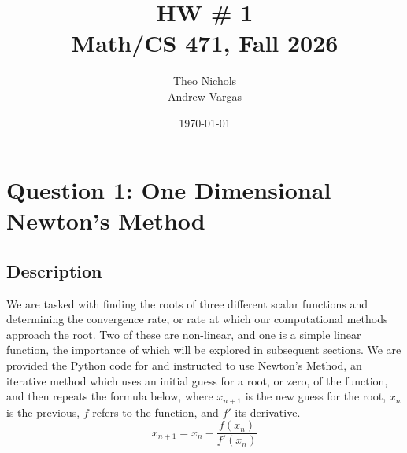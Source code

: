 \documentclass[12pt]{article}
\title{ HW \# 1\\ Math/CS 471, Fall 2026}
\author{Theo Nichols \\ Andrew Vargas}
\date{\today}   %
\begin{document}
\maketitle
\clearpage

\section{Question 1: One Dimensional Newton's Method}

\subsection{Description}
We are tasked with finding the roots of three different scalar functions and determining the convergence rate, or rate at which our computational methods approach the root. Two of these are non-linear, and one is a simple linear function, the importance of which will be explored in subsequent sections. We are provided the Python code for and instructed to use Newton's Method, an iterative method which uses an initial guess for a root, or zero, of the function, and then repeats the formula below, where $x_{n+1}$ is the new guess for the root, $x_n$ is the previous, $f$ refers to the function, and $f'$ its derivative.
\begin{equation*}
    x_{n+1} = x_n - \frac{f(x_n)}{f'(x_n)}
\end{equation*}
\end{document}
